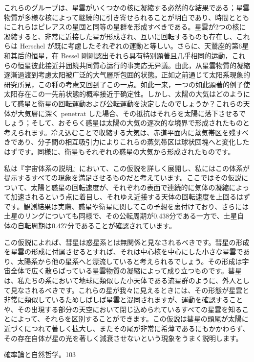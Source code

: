 \documentclass[a4paper,11pt,openany]{ltjsbook}
\begin{document}
これらのグループは、星雲がいくつかの核に凝縮する必然的な結果である；星雲物質が多様な核によって継続的に引き寄せられることが明白であり、時間とともにこれらはピレアスの星団と同等の星群を形成すべきである。星雲が2つの核に凝縮すると、非常に近接した星が形成され、互いに回転するものも存在し、これらは Herschel が既に考慮したそれぞれの運動と等しい。さらに、天鵞座的第6星和其后的恒星，在 Bessel 剛剛認出それら具有特别顕著且几乎相同的运動，これらの恒星彼此接近并囲繞共同質心运行的事実応无异議。由此，从星雲物質的凝縮逐漸過渡到考慮太阳被广泛的大气層所包囲的状態。正如之前通じて太阳系現象的研究所見，この種の考慮又回到了この一点。如此一来，一つの如此顕著的例子使太阳存在この一先前状態的概率接近于确定性。しかし、太陽の大気はどのようにして惑星と衛星の回転運動および公転運動を決定したのでしょうか？これらの天体が大気層に深く penetrat した場合、その抵抗はそれらを太陽に落下させるでしょう；そして、おそらく惑星は太陽の大気の逐次的な境界で形成されたものと考えられます。冷え込むことで収縮する大気は、赤道平面内に蒸気帯区を残すべきであり、分子間の相互吸引力によりこれらの蒸気帯区は球状団塊へと変化したはずです。同様に、衛星もそれぞれの惑星の大気から形成されたものです。

私は『宇宙体系の説明』において、この仮説を詳しく展開し、私にはこの体系が提示するすべての現象を満足させるものだと考えています。ここではその仮説について、太陽と惑星の回転速度が、それぞれの表面で連続的に気体の凝縮によって加速されるという点に着目し、それゆえ近接する天体の回転速度を上回るはずです。観測結果は実際、惑星や衛星に関してこの予想を裏付けており、さらには土星のリングについても同様で、その公転周期が0.438分である一方で、土星自体の自転周期は0.427分であることが確認されています。

この仮説によれば、彗星は惑星系とは無関係と見なされるべきです。彗星の形成を星雲の形成に付属させるとすれば、それは中心核を中心にした小さな星雲であり、太陽系から他の星系へと漂流していると考えられるでしょう。その形成は宇宙全体で広く散らばっている星雲物質の凝縮によって成り立つものです。彗星は、私たちの系において地球に類似した小天体である流星群のように、外人として見なされるべきです。これらの星が我々に見えるときには、その形態が星雲と非常に類似しているためしばしば星雲と混同されますが、運動を確認することや、その出現する部分の天空において閉じ込められているすべての星雲を知ることによって、それらを区別することができます。この仮説は彗星の頭尾が太陽に近づくにつれて著しく拡大し、またその尾が非常に希薄であるにもかかわらず、その存在自体が星の光を著しく減衰させないという現象をうまく説明します。

確率論と自然哲学。103
\end{document}
